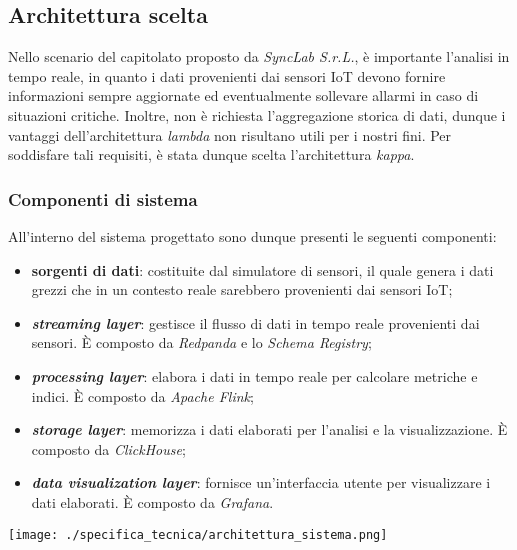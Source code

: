 \subsection{Architettura scelta}
Nello scenario del capitolato proposto da \textit{SyncLab S.r.L.}, è importante l'analisi in tempo reale, in quanto i dati provenienti dai sensori IoT devono fornire informazioni sempre aggiornate ed eventualmente
sollevare allarmi in caso di situazioni critiche. Inoltre, non è richiesta l'aggregazione storica di dati, dunque i vantaggi dell'architettura \textit{lambda} non risultano utili per i nostri fini.
Per soddisfare tali requisiti, è stata dunque scelta l'architettura \textit{kappa}.

\subsubsection{Componenti di sistema}
All'interno del sistema progettato sono dunque presenti le seguenti componenti:
\begin{itemize}
	\item \textbf{sorgenti di dati}: costituite dal simulatore di sensori, il quale genera i dati grezzi che in un contesto reale sarebbero provenienti dai sensori IoT;
	\item \textbf{\textit{streaming layer}}: gestisce il flusso di dati in tempo reale provenienti dai sensori. È composto da \textit{Redpanda} e lo \textit{Schema Registry};
	\item \textbf{\textit{processing layer}}: elabora i dati in tempo reale per calcolare metriche e indici. È composto da \textit{Apache Flink};
	\item \textbf{\textit{storage layer}}: memorizza i dati elaborati per l'analisi e la visualizzazione. È composto da \textit{ClickHouse};
	\item \textbf{\textit{data visualization layer}}: fornisce un'interfaccia utente per visualizzare i dati elaborati. È composto da \textit{Grafana}.
\end{itemize}

\begin{center}
	\texttt{[image: ./specifica\_tecnica/architettura\_sistema.png]}
\end{center}

